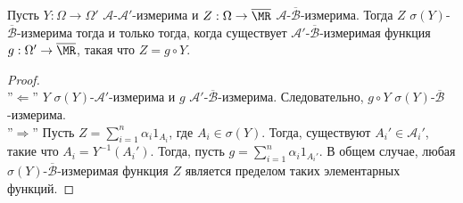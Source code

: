 \begin{thm}  \label{Factorization lemma}
	Пусть $Y:\Omega \rightarrow \Omega'$ $\mathcal{A}$-$\mathcal{A}'$-измерима и $Z: \Omega \rightarrow \overline{\MR}$ $\mathcal{A}$-$\overline{\mathcal{B}}$-измерима. Тогда $Z$ $\sigma(Y)$-$\overline{\mathcal{B}}$-измерима тогда и только тогда, когда существует $\mathcal{A}'$-$\overline{\mathcal{B}}$-измеримая функция $g:\Omega' \rightarrow \overline{\MR}$, такая что $Z = g \circ Y$.
\end{thm}
\begin{proof} \\
	
	''$\Longleftarrow$'' $Y$ $\sigma(Y)$-$\mathcal{A}'$-измерима и $g$ $\mathcal{A}'$-$\overline{\mathcal{B}}$-измерима. Следовательно, $g \circ Y$ $\sigma(Y)$-$\overline{\mathcal{B}}$-измерима. \\
	
	''$\Longrightarrow$'' Пусть $Z = \sum_{i=1}^n \alpha_i 1_{A_i}$, где $A_i \in \sigma(Y)$. Тогда, существуют $A_i' \in \mathcal{A}_i'$, такие что $A_i = Y^{-1}(A_i')$. Тогда, пусть $g = \sum_{i=1}^n \alpha_i 1_{A_i'}$. В общем случае, любая $\sigma(Y)$-$\overline{\mathcal{B}}$-измеримая функция $Z$ является пределом таких элементарных функций.
\end{proof}

